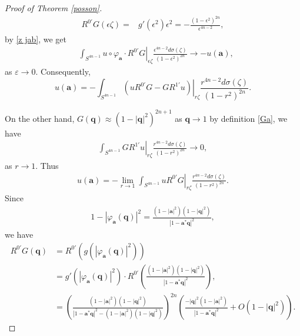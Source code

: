 \documentclass[a4paper,11pt]{amsart}
\numberwithin{equation}{section}
\begin{document}
\begin{proof}[Proof of Theorem \ref{posson}]
\begin{equation*}
\begin{aligned}
R^{0'}G(\epsilon\zeta)=&g'(\epsilon^2)\epsilon^2=-\frac{(1-\epsilon^2)^{2n}}{\epsilon^{4n-2}},
\end{aligned}\end{equation*}
by \eqref{z jab}, we get
\begin{equation*}\begin{aligned}
&\int_{S^{4n-1}}\left.u\circ\varphi_{\mathbf{a}}\cdot R^{0'}G\right|_{\epsilon\zeta} \frac{\epsilon^{4n-2}d\sigma(\zeta)}{(1-\epsilon^2)^{2n}}\rightarrow-u(\mathbf{a}),
\end{aligned}\end{equation*}
as $\varepsilon\rightarrow 0$. Consequently,
$$u(\mathbf{a})=-\int_{S^{4n-1}}\left.(uR^{0'}G-GR^{1'}u)\right|_{r\zeta}\frac{r^{4n-2}d\sigma(\zeta)}{(1-r^2)^{2n}}.$$

  On the other hand, $G(\mathbf{q})\approx (1-|\mathbf{q}|^2)^{2n+1}$ as $\mathbf{q}\rightarrow 1$ by definition \eqref{Ga}, we have
\begin{equation*}\begin{aligned}
\int_{S^{4n-1}}\left.GR^{1'}u\right|_{r\zeta}\frac{r^{4n-2}d\sigma(\zeta)}{(1-r^2)^{2n}}\rightarrow0,
\end{aligned}\end{equation*}
as $r\rightarrow 1$. Thus
\begin{equation}\begin{aligned}\label{ua}
u(\mathbf{a})=-\lim_{r\rightarrow 1}\int_{S^{4n-1}}\left.uR^{0'}G\right|_{r\zeta}\frac{r^{4n-2}d\sigma(\zeta)}{(1-r^2)^{2n}}.
\end{aligned}\end{equation}
Since
\begin{equation}\begin{aligned}\label{psi eq}
1-|\varphi_{\mathbf{a}}(\mathbf{q})|^2=\frac{(1-|\mathbf{a}|^2)(1-|\mathbf{q}|^2)}{|1-\mathbf{a}^*\mathbf{q}|^2},
\end{aligned}\end{equation}
we have
\begin{align*}
R^{0'} G(\mathbf{q}) &= R^{0'} \left( g\left( |\varphi_{\mathbf{a}}(\mathbf{q})|^2 \right) \right) \\
&= g'(|\varphi_{\mathbf{a}}(\mathbf{q})|^2) \cdot R^{0'}\left( \frac{(1 - |\mathbf{a}|^2)(1 - |\mathbf{q}|^2)}{|1 - \mathbf{a}^* \mathbf{q}|^2} \right),\\
&= \left( \frac{(1 - |\mathbf{a}|^2)(1 - |\mathbf{q}|^2)}{|1 - \mathbf{a}^* \mathbf{q}|^2 - (1 - |\mathbf{a}|^2)(1 - |\mathbf{q}|^2)} \right)^{2n}   \left(\frac{-|\mathbf{q}|^2 (1 - |\mathbf{a}|^2)}{|1 - \mathbf{a}^* \mathbf{q}|^2}+O(1-|\mathbf{q}|^2)\right).

\end{align*}
\end{proof}
\end{document}
